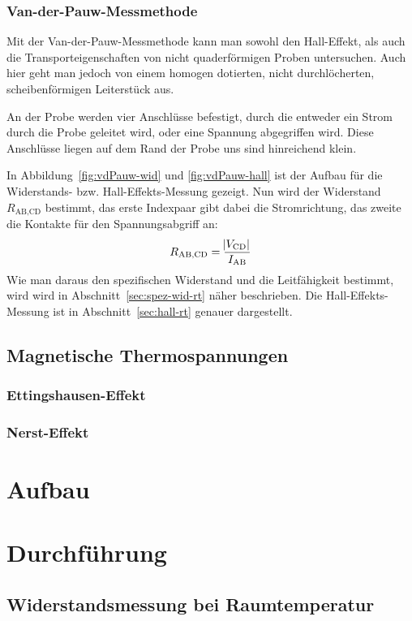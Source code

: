 \subsection{Van-der-Pauw-Messmethode}

Mit der Van-der-Pauw-Messmethode kann man sowohl den Hall-Effekt, als auch die
Transporteigenschaften von nicht quaderförmigen Proben untersuchen. Auch hier
geht man jedoch von einem homogen dotierten, nicht durchlöcherten,
scheibenförmigen Leiterstück aus.

An der Probe werden vier Anschlüsse befestigt, durch die entweder ein Strom
durch die Probe geleitet wird, oder eine Spannung abgegriffen wird. Diese
Anschlüsse liegen auf dem Rand der Probe uns sind hinreichend klein.

In Abbildung~\ref{fig:vdPauw-wid} und \ref{fig:vdPauw-hall} ist der Aufbau für
die Widerstands- bzw. Hall-Effekts-Messung gezeigt. Nun wird der Widerstand
$R_\text{AB,CD}$ bestimmt, das erste Indexpaar gibt dabei die Stromrichtung,
das zweite die Kontakte für den Spannungsabgriff an:
\[
    R_\text{AB,CD} = \frac{\abs{V_\text{CD}}}{I_\text{AB}}
\]
Wie man daraus den spezifischen Widerstand und die Leitfähigkeit bestimmt, wird
wird in Abschnitt~\ref{sec:spez-wid-rt} näher beschrieben. Die
Hall-Effekts-Messung ist in Abschnitt~\ref{sec:hall-rt} genauer dargestellt.

\section{Magnetische Thermospannungen}

\subsection{Ettingshausen-Effekt}

\subsection{Nerst-Effekt}

\FloatBarrier
\chapter{Aufbau}

\FloatBarrier
\chapter{Durchführung}

\section{Widerstandsmessung bei Raumtemperatur}

